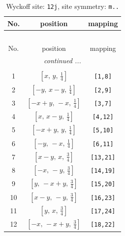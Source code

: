 \documentclass[fleqn,8pt]{jsarticle}
\begin{document}
\begin{longtable}{ccc}
\caption{Wyckoff site: {\tt 12j}, site symmetry: {\tt m..}}
 \\
 \hline \hline
No. & position & mapping \\ \hline \endfirsthead

\multicolumn{2}{l}{\tablename\ \thetable{}} \\
 \hline \hline
No. & position & mapping \\ \hline \endhead

 \hline \hline
\multicolumn{2}{r}{\footnotesize\it continued ...} \\ \endfoot

 \hline \hline
\multicolumn{2}{r}{} \\ \endlastfoot

1 & $\left[ x,\, y,\, \frac{1}{4} \right]$ & {\tt [1,8]} \\ \hline
2 & $\left[ - y,\, x - y,\, \frac{1}{4} \right]$ & {\tt [2,9]} \\ \hline
3 & $\left[ - x + y,\, - x,\, \frac{1}{4} \right]$ & {\tt [3,7]} \\ \hline
4 & $\left[ x,\, x - y,\, \frac{1}{4} \right]$ & {\tt [4,12]} \\ \hline
5 & $\left[ - x + y,\, y,\, \frac{1}{4} \right]$ & {\tt [5,10]} \\ \hline
6 & $\left[ - y,\, - x,\, \frac{1}{4} \right]$ & {\tt [6,11]} \\ \hline
7 & $\left[ x - y,\, x,\, \frac{3}{4} \right]$ & {\tt [13,21]} \\ \hline
8 & $\left[ - x,\, - y,\, \frac{3}{4} \right]$ & {\tt [14,19]} \\ \hline
9 & $\left[ y,\, - x + y,\, \frac{3}{4} \right]$ & {\tt [15,20]} \\ \hline
10 & $\left[ x - y,\, - y,\, \frac{3}{4} \right]$ & {\tt [16,23]} \\ \hline
11 & $\left[ y,\, x,\, \frac{3}{4} \right]$ & {\tt [17,24]} \\ \hline
12 & $\left[ - x,\, - x + y,\, \frac{3}{4} \right]$ & {\tt [18,22]} \\
\end{longtable}
\renewcommand{\arraystretch}{1.2}
\end{document}
